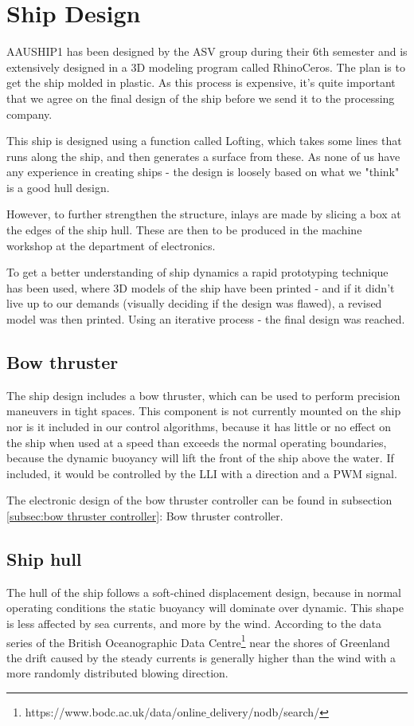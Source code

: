 \chapter{Ship Design}
AAUSHIP1 has been designed by the ASV group during their 6th semester and is extensively designed in a 3D modeling program called RhinoCeros. The plan is to get the ship molded in plastic. As this process is expensive, it's quite important that we agree on the final design of the ship before we send it to the processing company. 

This ship is designed using a function called Lofting, which takes some lines that runs along the ship, and then generates a surface from these. As none of us have any experience in creating ships - the design is loosely based on what we "think" is a good hull design. 

However, to further strengthen the structure, inlays are made by slicing a box at the edges of the ship hull. These are then to be produced in the machine workshop at the department of electronics. 

To get a better understanding of ship dynamics a rapid prototyping technique has been used, where 3D models of the ship have been printed - and if it didn't live up to our demands (visually deciding if the design was flawed), a revised model was then printed. Using an iterative process - the final design was reached.

\section{Bow thruster}
The ship design includes a bow thruster, which can be used to perform precision maneuvers in tight spaces. This component is not currently mounted on the ship nor is it included in our control algorithms, because it has little or no effect on the ship when used at a speed than exceeds the normal operating boundaries, because the dynamic buoyancy will lift the front of the ship above the water. If included, it would be controlled by the \ac{LLI} with a direction and a \ac{PWM} signal. 

The electronic design of the bow thruster controller can be found in subsection \ref{subsec:bow thruster controller}: Bow thruster controller.

\section{Ship hull}

The hull of the ship follows a soft-chined displacement design, because in normal operating conditions the static buoyancy will dominate over dynamic. This shape is less affected by sea currents, and more by the wind. According to the data series of the British Oceanographic Data Centre\footnote[1]{https://www.bodc.ac.uk/data/online$\_$delivery/nodb/search/} near the shores of Greenland the drift caused by the steady currents is generally higher than the wind with a more randomly distributed blowing direction.

